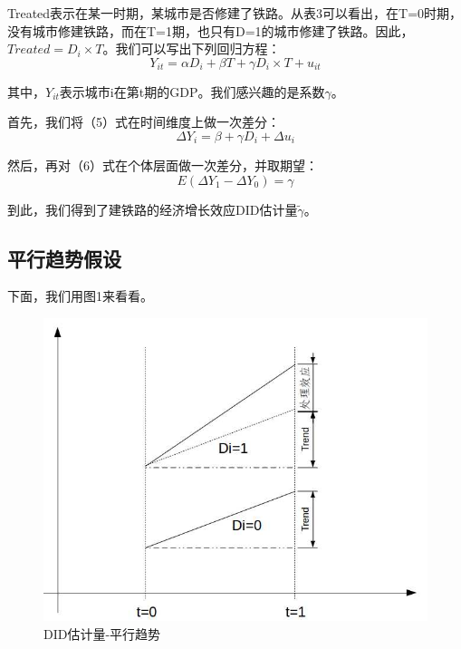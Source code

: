 \documentclass[cn,10pt,math=newtx,citestyle=gb7714-2015,bibstyle=gb7714-2015]{elegantbook}
\begin{document}
	Treated表示在某一时期，某城市是否修建了铁路。从表3可以看出，在T=0时期，没有城市修建铁路，而在T=1期，也只有D=1的城市修建了铁路。因此，$Treated=D_i\times{T}$。我们可以写出下列回归方程：
	\begin{equation}
		Y_{it}=\alpha{D}_i+\beta{T}+\gamma{D_i\times{T}}+u_{it}
	\end{equation}
	
	其中，$Y_{it}$表示城市i在第t期的GDP。我们感兴趣的是系数$\gamma$。
	
	首先，我们将（5）式在时间维度上做一次差分：
	\begin{equation}
		\Delta{Y}_i=\beta+\gamma{D}_i+\Delta{u}_i
	\end{equation}
	
	然后，再对（6）式在个体层面做一次差分，并取期望：
	\begin{equation}
		E(\Delta{Y}_1-\Delta{Y}_0)=\gamma
	\end{equation}
	
	到此，我们得到了建铁路的经济增长效应DID估计量$\tilde{\gamma}$。
	
	\subsection{平行趋势假设}
	
	下面，我们用图1来看看。
	\begin{figure}[htbp]
		\centering
		\includegraphics[width=1\textwidth]{commontrend.jpg}
		\caption{DID估计量-平行趋势}\label{fig:digit}
	\end{figure}
	
\end{document}

